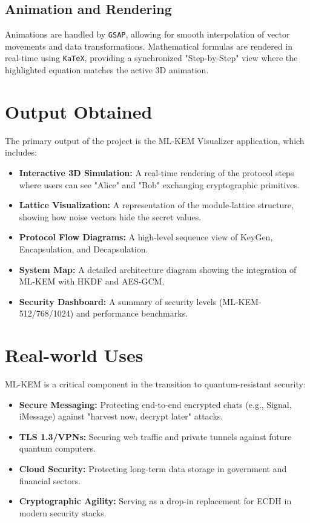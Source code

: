\documentclass[12pt,a4paper]{article}
\begin{document}
\subsection{Animation and Rendering}
Animations are handled by \texttt{GSAP}, allowing for smooth interpolation of vector movements and data transformations. Mathematical formulas are rendered in real-time using \texttt{KaTeX}, providing a synchronized "Step-by-Step" view where the highlighted equation matches the active 3D animation.

\section{Output Obtained}
The primary output of the project is the ML-KEM Visualizer application, which includes:
\begin{itemize}
    \item \textbf{Interactive 3D Simulation:} A real-time rendering of the protocol steps where users can see "Alice" and "Bob" exchanging cryptographic primitives.
    \item \textbf{Lattice Visualization:} A representation of the module-lattice structure, showing how noise vectors hide the secret values.
    \item \textbf{Protocol Flow Diagrams:} A high-level sequence view of KeyGen, Encapsulation, and Decapsulation.
    \item \textbf{System Map:} A detailed architecture diagram showing the integration of ML-KEM with HKDF and AES-GCM.
    \item \textbf{Security Dashboard:} A summary of security levels (ML-KEM-512/768/1024) and performance benchmarks.
\end{itemize}

\section{Real-world Uses}
ML-KEM is a critical component in the transition to quantum-resistant security:
\begin{itemize}
    \item \textbf{Secure Messaging:} Protecting end-to-end encrypted chats (e.g., Signal, iMessage) against "harvest now, decrypt later" attacks.
    \item \textbf{TLS 1.3/VPNs:} Securing web traffic and private tunnels against future quantum computers.
    \item \textbf{Cloud Security:} Protecting long-term data storage in government and financial sectors.
    \item \textbf{Cryptographic Agility:} Serving as a drop-in replacement for ECDH in modern security stacks.
\end{itemize}
\end{document}
